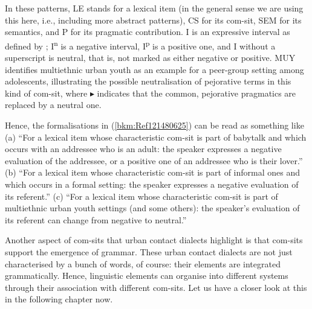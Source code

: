In these patterns, LE stands for a lexical item (in the general sense we are using this here, i.e., including more abstract patterns), CS for its com-sit, SEM for its semantics, and P for its pragmatic contribution. I is an expressive interval as defined by \citet{Potts2007}; I\textsuperscript{n} is a negative interval, I\textsuperscript{p} is a positive one, and I without a superscript is neutral, that is, not marked as either negative or positive. MUY identifies multiethnic urban youth as an example for a peer-group setting among adolescents, illustrating the possible neutralisation of pejorative terms in this kind of com-sit, where ${\blacktriangleright}$ indicates that the common, pejorative pragmatics are replaced by a neutral one.

Hence, the formalisations in (\ref{bkm:Ref121480625}) can be read as something like (a) “For a lexical item whose characteristic com-sit is part of babytalk and which occurs with an addressee who is an adult: the speaker expresses a negative evaluation of the addressee, or a positive one of an addressee who is their lover.”  (b) “For a lexical item whose characteristic com-sit is part of informal ones and which occurs in a formal setting: the speaker expresses a negative evaluation of its referent.” (c) “For a lexical item whose characteristic com-sit is part of multiethnic urban youth settings (and some others): the speaker’s evaluation of its referent can change from negative to neutral.”

Another aspect of com-sits that urban contact dialects highlight is that com-sits support the emergence of grammar. These urban contact dialects are not just characterised by a bunch of words, of course: their elements are integrated grammatically. Hence, linguistic elements can organise into different systems through their association with different com-sits. Let us have a closer look at this in the following chapter now.

